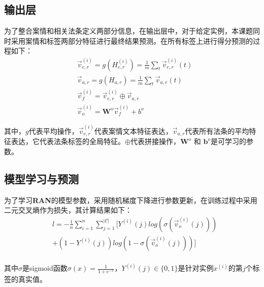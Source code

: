 \subsection{输出层}
为了整合案情和相关法条定义两部分信息，在输出层中，对于给定实例，本课题同时采用案情和标签两部分特征进行最终结果预测。在所有标签上进行得分预测的过程如下：
\begin{equation}
    \begin{aligned}
        & \vec{v}_{e,r}^{(i)} = g(H_{e,r}^{(i)}) = \frac{1}{m}\sum\limits_{t}\vec{v}_{e,r}^{(i)}(t) \\
        & \vec{v}_{a,r} = g(H_{a,r}) = \frac{1}{m}\sum\limits_{t}\vec{v}_{a,r}(t) \\
        & \vec{v}_{f}^{(i)} = \vec{v}_{e,r}^{(i)} \oplus \vec{v}_{a,r} \\
        & \vec{v}_{o}^{(i)} = \textbf{W}^{o}\vec{v}_{f}^{(i)} + b^{o}
    \end{aligned}
\end{equation}

其中，$g$代表平均操作，$\vec{v}_{e,r}^{(i)}$代表案情文本特征表达，$\vec{v}_{a,r}$代表所有法条的平均特征表达，它代表法条标签的全局特征。$\oplus$代表拼接操作，$\textbf{W}^{o}$ 和 $\textbf{b}^{o}$是可学习的参数。

\subsection{模型学习与预测}
为了学习\textbf{RAN}的模型参数，采用随机梯度下降进行参数更新，在训练过程中采用二元交叉熵作为损失，其计算结果如下：
\begin{equation}\label{eq:loss}
    \begin{aligned}
        & l = -\frac{1}{n}\sum\limits_{i=1}^{n}\sum\limits_{j=1}^{|\mathcal{C}|}[Y^{(i)}(j)log(\sigma(\vec{v}^{(i)}_{o}(j))) \\
        & + (1 - Y^{(i)}(j))log(1 - \sigma(\vec{v}^{(i)}_{o}(j)))] \\
    \end{aligned}
\end{equation}

其中$\sigma$是sigmoid函数$\sigma(x)=\frac{1}{1 + e^{-x}}$，$Y^{(i)}(j) \in \{0, 1\}$是针对实例$x^{(i)}$的第$j$个标签的真实值。

